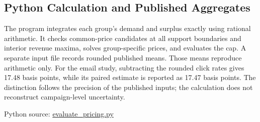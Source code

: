 \hypertarget{M09-python-calculation-and-published-aggregates}{%
\subsection{Python Calculation and Published
Aggregates}\label{M09-python-calculation-and-published-aggregates}}

\noindent The program integrates each group's demand and surplus exactly using
rational arithmetic. It checks common-price candidates at all support
boundaries and interior revenue maxima, solves group-specific prices,
and evaluates the cap. A separate input file records rounded published
means. Those means reproduce arithmetic only. For the email study,
subtracting the rounded click rates gives 17.48 basis points, while its
paired estimate is reported as 17.47 basis points. The distinction
follows the precision of the published inputs; the calculation does not
reconstruct campaign-level uncertainty.

\FloatBarrier
{}
Python source:
\href{../03_Data_and_Code/AI_Experimentation_and_Pricing/evaluate_pricing.py}{evaluate\_pricing.py}

